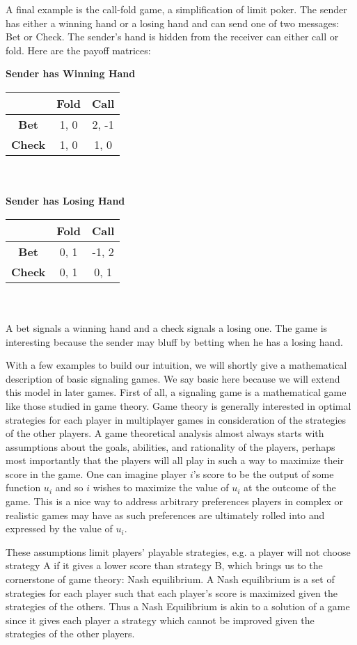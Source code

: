 \documentclass{article}
\begin{document}
A final example is the call-fold game, a simplification of limit poker. The sender has either a winning hand or a losing hand and can send one of two messages: Bet or Check. The sender's hand is hidden from the receiver can either call or fold. Here are the payoff matrices:

\textbf{Sender has Winning Hand}\\
\begin{tabular}{c | c | c} & \textbf{Fold} & \textbf{Call} \\ \hline \textbf{Bet} & 1, 0 & 2, -1 \\ \hline  \textbf{Check} & 1, 0 & 1, 0 \end{tabular}
\\ \\
\textbf{Sender has Losing Hand}\\
\begin{tabular}{c | c | c} & \textbf{Fold} & \textbf{Call} \\ \hline \textbf{Bet} & 0, 1 & -1, 2 \\ \hline  \textbf{Check} & 0, 1 & 0, 1 \end{tabular}
\\ \\

A bet signals a winning hand and a check signals a losing one. The game is interesting because the sender may bluff by betting when he has a losing hand. 

With a few examples to build our intuition, we will shortly give a mathematical description of basic signaling games. We say basic here because we will extend this model in later games. First of all, a signaling game is a mathematical game like those studied in game theory. Game theory is generally interested in optimal strategies for each player in multiplayer games in consideration of the strategies of the other players. A game theoretical analysis almost always starts with assumptions about the goals, abilities, and rationality of the players, perhaps most importantly that the players will all play in such a way to maximize their score in the game. One can imagine player $i$'s score to be the output of some function $u_i$ and so $i$ wishes to maximize the value of $u_i$ at the outcome of the game. This is a nice way to address arbitrary preferences players in complex or realistic games may have as such preferences are ultimately rolled into and expressed by the value of $u_i$. 

These assumptions limit players' playable strategies, e.g. a player will not choose strategy A if it gives a lower score than strategy B, which brings us to the cornerstone of game theory: Nash equilibrium. A Nash equilibrium is a set of strategies for each player such that each player's score is maximized given the strategies of the others. Thus a Nash Equilibrium is akin to a solution of a game since it gives each player a strategy which cannot be improved given the strategies of the other players.
\end{document}
